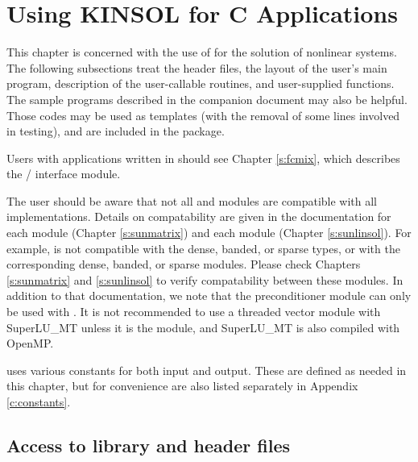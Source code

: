 \chapter{Using KINSOL for C Applications}\label{c:usage}

This chapter is concerned with the use of {\kinsol} for the solution
of nonlinear systems. The following subsections treat the header
files, the layout of the user's main program, description of the
{\kinsol} user-callable routines, and user-supplied functions.
The sample programs described in the companion document
\cite{kinsol_ex} may also be helpful.  Those codes may be used as
templates (with the removal of some lines involved in testing), and
are included in the {\kinsol} package.

Users with applications written in {\F} should see Chapter \ref{s:fcmix},
which describes the {\F}/{\CC} interface module.

The user should be aware that not all {\sunlinsol} and {\sunmatrix}
modules are compatible with all {\nvector} implementations.
Details on compatability are given in the documentation for each
{\sunmatrix} module (Chapter \ref{s:sunmatrix}) and each {\sunlinsol}
module (Chapter \ref{s:sunlinsol}). For example, {\nvecp} is not
compatible with the dense, banded, or sparse {\sunmatrix} types, or with
the corresponding dense, banded, or sparse {\sunlinsol} modules.  Please
check Chapters \ref{s:sunmatrix} and \ref{s:sunlinsol} to verify
compatability between these modules.  In addition to that
documentation, we note that the preconditioner module {\kinbbdpre}
can only be used with {\nvecp}.
It is not recommended to use a threaded vector module with SuperLU\_MT
unless it is the {\nvecopenmp} module, and SuperLU\_MT is also compiled
with OpenMP.

{\kinsol} uses various constants for both input and output. These are
defined as needed in this chapter, but for convenience are also listed
separately in Appendix \ref{c:constants}.

\section{Access to library and header files}\label{ss:file_access}

